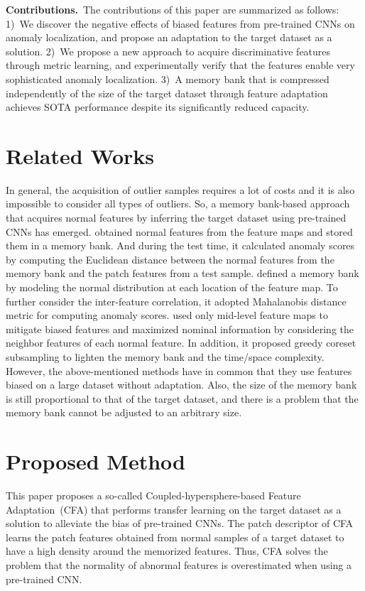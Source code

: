 \documentclass[10pt,twocolumn,letterpaper]{article}
\begin{document}
    \textbf{Contributions.}~The contributions of this paper are summarized as follows: 1)~We discover the negative effects of biased features from pre-trained CNNs on anomaly localization, and propose an adaptation to the target dataset as a solution. 2)~We propose a new approach to acquire discriminative features through metric learning, and experimentally verify that the features enable very sophisticated anomaly localization. 3)~A memory bank that is compressed independently of the size of the target dataset through feature adaptation achieves SOTA performance despite its significantly reduced capacity.

\section{Related Works}
    In general, the acquisition of outlier samples requires a lot of costs and it is also impossible to consider all types of outliers. So, a memory bank-based approach that acquires normal features by inferring the target dataset using pre-trained CNNs has emerged. \cite{SPADE} obtained normal features from the feature maps and stored them in a memory bank. And during the test time, it calculated anomaly scores by computing the Euclidean distance between the normal features from the memory bank and the patch features from a test sample. \cite{PaDiM} defined a memory bank by modeling the normal distribution at each location of the feature map. To further consider the inter-feature correlation, it adopted Mahalanobis distance metric for computing anomaly scores. \cite{PatchCore} used only mid-level feature maps to mitigate biased features and maximized nominal information by considering the neighbor features of each normal feature. In addition, it proposed greedy coreset subsampling to lighten the memory bank and the time/space complexity. However, the above-mentioned methods have in common that they use features biased on a large dataset without adaptation. Also, the size of the memory bank is still proportional to that of the target dataset, and there is a problem that the memory bank cannot be adjusted to an arbitrary size.

\section{Proposed Method}
    This paper proposes a so-called Coupled-hypersphere-based Feature Adaptation~(CFA) that performs transfer learning on the target dataset as a solution to alleviate the bias of pre-trained CNNs. The patch descriptor of CFA learns the patch features obtained from normal samples of a target dataset to have a high density around the memorized features. Thus, CFA solves the problem that the normality of abnormal features is overestimated when using a pre-trained CNN.
    
\end{document}
